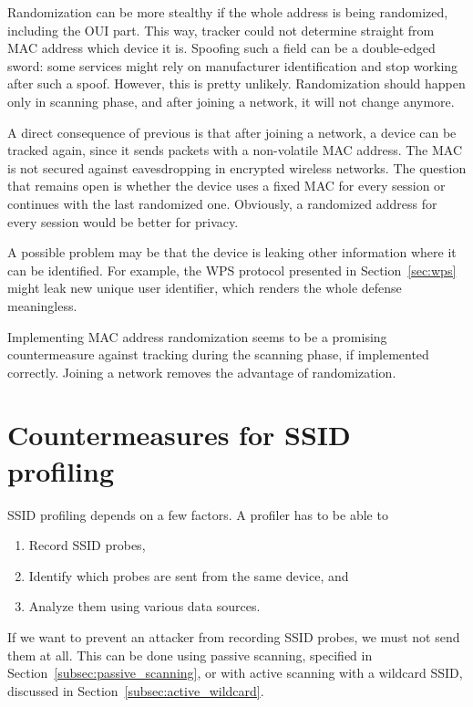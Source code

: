 \documentclass[12pt,a4paper,oneside,pdftex]{report}
\begin{document}
Randomization can be more stealthy if the whole address is being randomized, including the OUI part. This way, tracker could not determine straight from MAC address which device it is. Spoofing such a field can be a double-edged sword: some services might rely on manufacturer identification and stop working after such a spoof. However, this is pretty unlikely. Randomization should happen only in scanning phase, and after joining a network, it will not change anymore.

A direct consequence of previous is that after joining a network, a device can be tracked again, since it sends packets with a non-volatile MAC address. The MAC is not secured against eavesdropping in encrypted wireless networks. The question that remains open is whether the device uses a fixed MAC for every session or continues with the last randomized one. Obviously, a randomized address for every session would be better for privacy.

A possible problem may be that the device is leaking other information where it can be identified. For example, the WPS protocol presented in Section~\ref{sec:wps} might leak new unique user identifier, which renders the whole defense meaningless.

Implementing MAC address randomization seems to be a promising countermeasure against tracking during the scanning phase, if implemented correctly. Joining a network removes the advantage of randomization.

\section{Countermeasures for SSID profiling}
\label{sec:countermeasures_ssid}

SSID profiling depends on a few factors. A profiler has to be able to \begin{enumerate}
    \item Record SSID probes,
    \item Identify which probes are sent from the same device, and
    \item Analyze them using various data sources.
\end{enumerate}

If we want to prevent an attacker from recording SSID probes, we must not send them at all. This can be done using passive scanning, specified in Section~\ref{subsec:passive_scanning}, or with active scanning with a wildcard SSID, discussed in Section~\ref{subsec:active_wildcard}.
\end{document}
